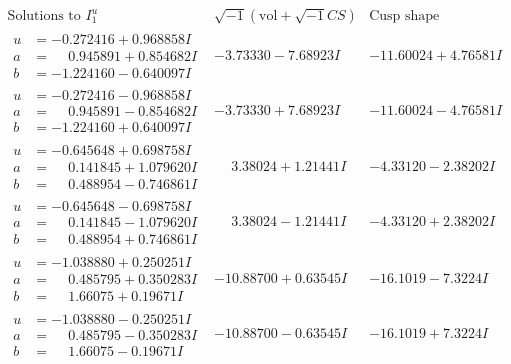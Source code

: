 \documentclass[1p]{elsarticle_modified}
\theoremstyle{definition}
\newcommand{\I}{\sqrt{-1}}
\begin{document}
$$\begin{array}{c|c|c}  
\text{Solutions to }I^u_{1}& \I (\text{vol} + \sqrt{-1}CS) & \text{Cusp shape}\\
 \hline 
\begin{aligned}
u &= -0.272416 + 0.968858 I \\
a &= \phantom{-}0.945891 + 0.854682 I \\
b &= -1.224160 - 0.640097 I\end{aligned}
 & -3.73330 - 7.68923 I & -11.60024 + 4.76581 I \\ \hline\begin{aligned}
u &= -0.272416 - 0.968858 I \\
a &= \phantom{-}0.945891 - 0.854682 I \\
b &= -1.224160 + 0.640097 I\end{aligned}
 & -3.73330 + 7.68923 I & -11.60024 - 4.76581 I \\ \hline\begin{aligned}
u &= -0.645648 + 0.698758 I \\
a &= \phantom{-}0.141845 + 1.079620 I \\
b &= \phantom{-}0.488954 - 0.746861 I\end{aligned}
 & \phantom{-}3.38024 + 1.21441 I & -4.33120 - 2.38202 I \\ \hline\begin{aligned}
u &= -0.645648 - 0.698758 I \\
a &= \phantom{-}0.141845 - 1.079620 I \\
b &= \phantom{-}0.488954 + 0.746861 I\end{aligned}
 & \phantom{-}3.38024 - 1.21441 I & -4.33120 + 2.38202 I \\ \hline\begin{aligned}
u &= -1.038880 + 0.250251 I \\
a &= \phantom{-}0.485795 + 0.350283 I \\
b &= \phantom{-}1.66075 + 0.19671 I\end{aligned}
 & -10.88700 + 0.63545 I & -16.1019 - 7.3224 I \\ \hline\begin{aligned}
u &= -1.038880 - 0.250251 I \\
a &= \phantom{-}0.485795 - 0.350283 I \\
b &= \phantom{-}1.66075 - 0.19671 I\end{aligned}
 & -10.88700 - 0.63545 I & -16.1019 + 7.3224 I \\ \hline\begin{aligned}

\end{aligned}
\end{array}$$
\end{document}
